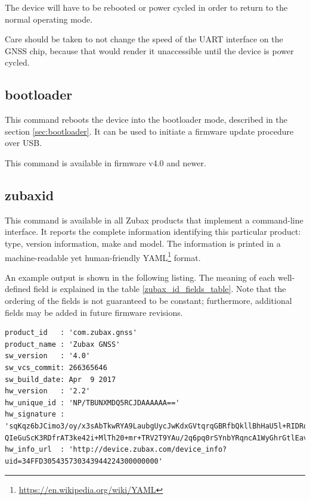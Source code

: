\documentclass{zubaxdoc}
\begin{document}
The device will have to be rebooted or power cycled in order to return to the normal operating mode.

Care should be taken to not change the speed of the UART interface on the GNSS chip,
because that would render it unaccessible until the device is power cycled.

\subsection{bootloader}

This command reboots the device into the bootloader mode, described in the section \ref{sec:bootloader}.
It can be used to initiate a firmware update procedure over USB.

This command is available in firmware v4.0 and newer.

\subsection{zubax{\textunderscore}id}\label{sec:cli_command_zubax_id}

This command is available in all Zubax products that implement a command-line interface.
It reports the complete information identifying this particular product:
type, version information, make and model.
The information is printed in a machine-readable yet human-friendly
YAML\footnote{\url{https://en.wikipedia.org/wiki/YAML}} format.

An example output is shown in the following listing.
The meaning of each well-defined field is explained in the table \ref{zubax_id_fields_table}.
Note that the ordering of the fields is not guaranteed to be constant;
furthermore, additional fields may be added in future firmware revisions.

\begin{minipage}{0.9\textwidth} %
\begin{verbatim}
product_id   : 'com.zubax.gnss'
product_name : 'Zubax GNSS'
sw_version   : '4.0'
sw_vcs_commit: 266365646
sw_build_date: Apr  9 2017
hw_version   : '2.2'
hw_unique_id : 'NP/TBUNXMDQ5RCJDAAAAAA=='
hw_signature : 'sqKqz6bJCimo3/oy/x3sAbTkwRYA9LaubgUycJwKdxGVtqrqGBRfbQkllBhHaU5l+RIDRqKnxQVSzU7
QIeGuScK3RDfrAT3ke42i+MlTh20+mr+TRV2T9YAu/2q6pq0rSYnbYRqncA1WyGhrGtlEav/K4svfL/jgwNxfE3d/YiI='
hw_info_url  : 'http://device.zubax.com/device_info?uid=34FFD305435730343944224300000000'
\end{verbatim}
\end{minipage}
\end{document}
